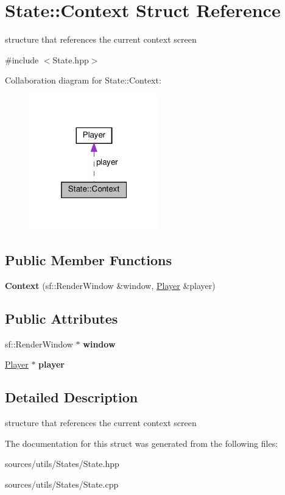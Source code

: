 \hypertarget{structState_1_1Context}{}\section{State\+:\+:Context Struct Reference}
\label{structState_1_1Context}


structure that references the current context screen  




{\ttfamily \#include $<$State.\+hpp$>$}



Collaboration diagram for State\+:\+:Context\+:
\nopagebreak
\begin{figure}[H]
\begin{center}
\leavevmode
\includegraphics[width=160pt]{structState_1_1Context__coll__graph}
\end{center}
\end{figure}
\subsection*{Public Member Functions}
\begin{DoxyCompactItemize}
\item 
\mbox{\label{structState_1_1Context_a8016ecde0d28a4df5ea03a0609e5c2d1}} 
{\bfseries Context} (sf\+::\+Render\+Window \&window, \hyperlink{classPlayer}{Player} \&player)
\end{DoxyCompactItemize}
\subsection*{Public Attributes}
\begin{DoxyCompactItemize}
\item 
\mbox{\label{structState_1_1Context_a30775e70e841c761a4e3cb7f0e195128}} 
sf\+::\+Render\+Window $\ast$ {\bfseries window}
\item 
\mbox{\label{structState_1_1Context_a1c98434687748acdebf78fd80a4767ad}} 
\hyperlink{classPlayer}{Player} $\ast$ {\bfseries player}
\end{DoxyCompactItemize}


\subsection{Detailed Description}
structure that references the current context screen 

The documentation for this struct was generated from the following files\+:\begin{DoxyCompactItemize}
\item 
sources/utils/\+States/State.\+hpp\item 
sources/utils/\+States/State.\+cpp\end{DoxyCompactItemize}
